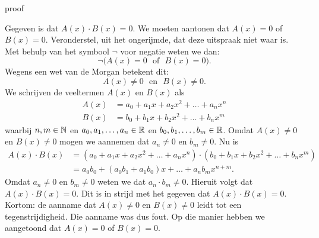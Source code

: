 \documentclass{ximera}
\begin{document}
\begin{expandable}{proof}

Gegeven is dat \(A(x)\cdot B(x) = 0\). We moeten aantonen dat \(A(x) = 0\) of \(B(x) = 0\). Veronderstel, uit het ongerijmde, dat deze uitspraak niet waar is. Met behulp van het symbool \(\neg\) voor 
negatie weten we dan:
\[
\neg\bigl(A(x) = 0 \,\, \text{ of } \,\, B(x) = 0\bigr).
\]
Wegens een wet van de Morgan betekent dit:
\[
A(x) \neq 0 \,\, \text{ en } \,\, B(x) \neq 0.
\] 
We schrijven de veeltermen \(A(x)\) en \(B(x)\) als
\begin{align*}
A(x) & = a_0 + a_1 x + a_2 x^2 + \dots + a_n x^n \\
B(x) & = b_0 + b_1 x + b_2 x^2 + \dots + b_n x^m
\end{align*}
waarbij \(n,m \in \mathbb{N}\) en \(a_0, a_1, \ldots, a_n \in \mathbb{R}\) en \(b_0, b_1, \ldots, b_m \in \mathbb{R}\). Omdat \(A(x) \neq 0\) en \(B(x) \neq 0\) mogen we aannemen dat \(a_n \neq 0\) en \(b_m \neq 0\). Nu is
\begin{align*}
A(x) \cdot B(x) 
& = \left(a_0 + a_1 x + a_2 x^2 + \dots + a_n x^n\right) \cdot \left( b_0 + b_1 x + b_2 x^2 + \dots + b_n x^m\right) \\
& = a_0b_0 + (a_0b_1 + a_1b_0)x + \dots + a_n b_m x^{n+m}.
\end{align*}
Omdat \(a_n \neq 0\) en \(b_m \neq 0\) weten we dat \(a_n \cdot b_m \neq 0\). Hieruit volgt dat \(A(x) \cdot B(x) = 0\). Dit is in strijd met het gegeven dat \(A(x)\cdot B(x) = 0\). Kortom: de aanname dat \(A(x) \neq 0\) en \(B(x) \neq 0\) leidt tot een tegenstrijdigheid. Die aanname was dus fout. Op die manier hebben we aangetoond dat \(A(x) = 0\) of \(B(x) = 0\). 

\end{expandable}





\end{document}
